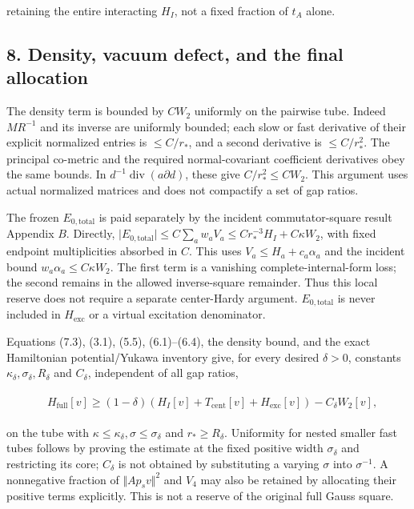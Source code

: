 retaining the entire interacting \(H_{I}\), not a fixed fraction of
\(t_{A}\) alone.

\subsection{8. Density, vacuum defect, and the final
allocation}\label{h-density-vacuum-defect-and-the-final-allocation}

The density term is bounded by \(CW_{2}\) uniformly on the pairwise
tube. Indeed \(M R^{-1}\) and its inverse are uniformly bounded; each
slow or fast derivative of their explicit normalized entries is
\(\le C/r_{*}\), and a second derivative is \(\le C/r_{*}^{2}\). The
principal co-metric and the required normal-covariant coefficient
derivatives obey the same bounds. In
\(d^{-1}\operatorname{div} (a \partial  d)\), these give
\(C/r_{*}^{2}\le CW_{2}\). This argument uses actual normalized matrices
and does not compactify a set of gap ratios.

The frozen \(E_{0,\mathrm{total}}\) is paid separately by the incident
commutator-square result Appendix \(B\). Directly,
\(\vert E_{0,\mathrm{total}}\vert \le C \sum _{a} w_{a}V_{a}\le Cr_{*}^{-3}H_{I}+C \kappa  W_{2}\),
with fixed endpoint multiplicities absorbed in \(C\). This uses
\(V_{a}\le H_{a}+c_{a} \alpha _{a}\) and the incident bound
\(w_{a} \alpha _{a}\le C \kappa  W_{2}\). The first term is a vanishing
complete-internal-form loss; the second remains in the allowed
inverse-square remainder. Thus this local reserve does not require a
separate center-Hardy argument. \(E_{0,\mathrm{total}}\) is never
included in \(H_{\mathrm{exc}}\) or a virtual excitation denominator.

Equations (7.3), (3.1), (5.5), (6.1)--(6.4), the density bound, and the
exact Hamiltonian potential/Yukawa inventory give, for every desired
\(\delta  >0\), constants
\(\kappa _{\delta} , \sigma _{\delta} , R_{\delta}\) and \(C_{\delta}\),
independent of all gap ratios,

\begin{gather*}
\begin{aligned}
& H_{\mathrm{full}}[v]\ge (1- \delta  )(H_{I}[v]+T_{\mathrm{cent}}[v]+H_{\mathrm{exc}}[v])-C_{\delta} W_{2}[v],
\end{aligned}\tag{8.1}
\end{gather*}

on the tube with
\(\kappa  \le  \kappa _{\delta} , \sigma  \le  \sigma _{\delta}\) and
\(r_{*}\ge R_{\delta}\). Uniformity for nested smaller fast tubes
follows by proving the estimate at the fixed positive width
\(\sigma _{\delta}\) and restricting its core; \(C_{\delta}\) is not
obtained by substituting a varying \(\sigma\) into \(\sigma ^{-1}\). A
nonnegative fraction of \(\Vert A p_{s} v\Vert ^{2}\) and \(V_{4}\) may
also be retained by allocating their positive terms explicitly. This is
not a reserve of the original full Gauss square.

